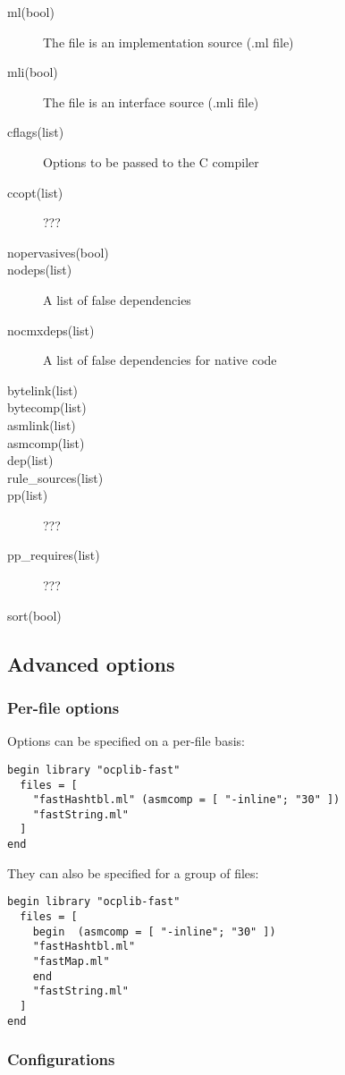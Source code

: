\begin{description}
\item[ml(bool)] The file is an implementation source (.ml file)
\item[mli(bool)] The file is an interface source (.mli file)
\item[cflags(list)] Options to be passed to the C compiler
\item[ccopt(list)] ???
\item[nopervasives(bool)]
\item[nodeps(list)] A list of false dependencies
\item[nocmxdeps(list)] A list of false dependencies for native code
\item[bytelink(list)]
\item[bytecomp(list)]
\item[asmlink(list)]
\item[asmcomp(list)]
\item[dep(list)]
\item[rule\_sources(list)]
\item[pp(list)] ???
\item[pp\_requires(list)] ???
\item[sort(bool)]
\end{description}


\subsection{Advanced options}

\subsubsection{Per-file options}

Options can be specified on a per-file basis:

\begin{verbatim}
begin library "ocplib-fast"
  files = [
    "fastHashtbl.ml" (asmcomp = [ "-inline"; "30" ])
    "fastString.ml"
  ]
end
\end{verbatim}

They can also be specified for a group of files:

\begin{verbatim}
begin library "ocplib-fast"
  files = [
    begin  (asmcomp = [ "-inline"; "30" ])
    "fastHashtbl.ml"
    "fastMap.ml"
    end
    "fastString.ml"
  ]
end
\end{verbatim}


\subsubsection{Configurations}

